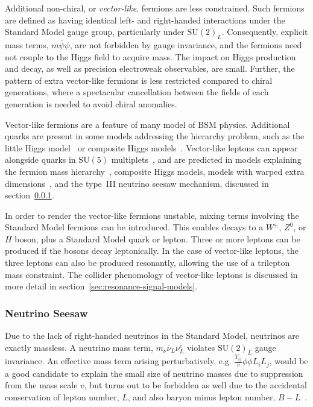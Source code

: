 Additional non-chiral, or \emph{vector-like}, fermions are less constrained. Such fermions are defined as having identical left- and right-handed interactions under the Standard Model gauge group, particularly under $\mathrm{SU}(2)_L$. Consequently, explicit mass terms, $m\overline{\psi}\psi$, are not forbidden by gauge invariance, and the fermions need not couple to the Higgs field to acquire mass. The impact on Higgs production and decay, as well as precision electroweak observables, are small. Further, the pattern of extra vector-like fermions is less restricted compared to chiral generations, where a spectacular cancellation between the fields of each generation is needed to avoid chiral anomalies. 

Vector-like fermions are a feature of many model of BSM physics. Additional quarks are present in some models addressing the hierarchy problem, such as the little Higgs model~\cite{Arkani-Hamed:557546} or composite Higgs models~\cite{Kaplan:148688}. Vector-like leptons can appear alongside quarks in $\mathrm{SU}(5)$ multiplets~\cite{Martin:2012dx}, and are predicted in models explaining the fermion mass hierarchy~\cite{Falkowski:2014hs}, composite Higgs models, models with warped extra dimensions~\cite{Redi:2013ib,Contino:1005586}, and the type~III neutrino seesaw mechanism, discussed in section~\ref{sec:theory-bsm-seesaw}. 

In order to render the vector-like fermions unstable, mixing terms involving the Standard Model fermions can be introduced. This enables decays to a $W^{\pm}$, $Z^0$, or $H$ boson, plus a Standard Model quark or lepton. Three or more leptons can be produced if the bosons decay leptonically. In the case of vector-like leptons, the three leptons can also be produced resonantly, allowing the use of a trilepton mass constraint. The collider phenomology of vector-like leptons is discussed in more detail in section~\ref{sec:resonance-signal-models}.



\subsubsection{Neutrino Seesaw}\label{sec:theory-bsm-seesaw}
Due to the lack of right-handed neutrinos in the Standard Model, neutrinos are exactly massless. A neutrino mass term, $m_{\nu} \overline{\nu}_L \nu_L^c$ violates $\mathrm{SU}(2)_L$ gauge invariance. An effective mass term arising perturbatively, e.g. $\frac{Y_{ij}}{v}\phi\phi L_i L_j$, would be a good candidate to explain the small size of neutrino masses due to suppression from the mass scale $v$, but turns out to be forbidden as well due to the accidental conservation of lepton number, $L$, and also baryon minus lepton number, $B-L$~\cite{RevModPhys.75.345}. 

